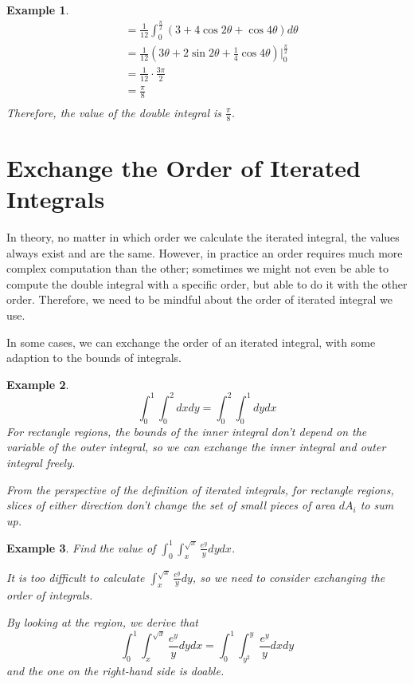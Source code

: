 \documentclass{article}
\newtheorem{example}{Example}
\begin{document}
\begin{example}
\begin{equation*}
\begin{split}
                                                     &= \frac{1}{12} \int_0^{\frac{\pi}{2}} (3 + 4\cos2\theta + \cos 4\theta) d\theta \\
                                                     &= \frac{1}{12} (3\theta + 2\sin2\theta + \frac{1}{4}\cos 4\theta)|_0^{\frac{\pi}{2}} \\
                                                     &= \frac{1}{12} \cdot \frac{3\pi}{2} \\
                                                     &= \frac{\pi}{8} \\
    \end{split}
  \end{equation*}
  Therefore, the value of the double integral is $\frac{\pi}{8}$.
\end{example}

\section{Exchange the Order of Iterated Integrals}

In theory, no matter in which order we calculate the iterated integral, the 
values always exist and are the same. However, in practice an order requires 
much more complex computation than the other; sometimes we might not even be 
able to compute the double integral with a specific order, but able to do it 
with the other order. Therefore, we need to be mindful about the order of 
iterated integral we use.

In some cases, we can exchange the order of an iterated integral, with some 
adaption to the bounds of integrals.

\begin{example}
  \begin{equation*}
    \int_0^1 \int_0^2 dx dy = \int_0^2 \int_0^1 dy dx
  \end{equation*}
  For rectangle regions, the bounds of the inner integral don't depend on the 
  variable of the outer integral, so we can exchange the inner integral and 
  outer integral freely.

  From the perspective of the definition of iterated integrals, for rectangle 
  regions, slices of either direction don't change the set of small pieces of 
  area $dA_i$ to sum up.
\end{example}

\begin{example}
  Find the value of $\int_0^1 \int_x^{\sqrt{x}} \frac{e^y}{y} dy dx$.

  It is too difficult to calculate $\int_x^{\sqrt{x}} \frac{e^y}{y} dy$, so we 
  need to consider exchanging the order of integrals.

  By looking at the region, we derive that
  \begin{equation*}
    \int_0^1 \int_x^{\sqrt{x}} \frac{e^y}{y} dy dx = \int_0^1 \int_{y^2}^y \frac{e^y}{y} dx dy
  \end{equation*}
  and the one on the right-hand side is doable.
\end{example}
\end{document}
